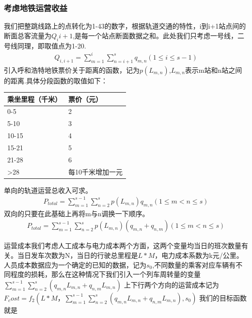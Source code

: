 \documentclass[12pt,a4paper]{mcmthesis}
\begin{document}
    \subsubsection{考虑地铁运营收益}
    我们把整跳线路上的点转化为1-43的数字，根据轨道交通的特性，i到i+1站点间的断面总客流量为$Q_{i}{i+1}$,是每一个站点断面数据之和。此处我们只考虑一号线，二号线同理，即取值点为1-20.
    \begin{equation}
        \begin{aligned}
            Q_{i,i+1}=\sum_{m=1}^{i}\sum_{n=i+1}^{s}q_{m,n}(1\leqslant i\leqslant s-1)
        \end{aligned}
    \end{equation}
    引入呼和浩特地铁票价关于距离的函数，记为$p(L_{m,n})$,$L_{m,n}$表示m站和n站之间的距离.具体分段函数的取值如下：
    \begin{table}
        \centering
        \begin{tabular}{|l|l|}
            \hline
            乘坐里程（千米） & 票价（元）     \\ \hline
            0-5      & 2         \\ \hline
            5-10     & 3         \\ \hline
            10-15    & 4         \\ \hline
            15-21    & 5         \\ \hline
            21-28    & 6         \\ \hline
            >28      & 每10千米增加一元 \\ \hline
        \end{tabular}
    \end{table}
    单向的轨道运营总收入可求。
    \begin{equation}
        \begin{aligned}
            P_{total}=\sum_{m=1}^{s-1}\sum_{n=2}^{s}p(L_{m,n})q_{m,n} (1\leqslant m< n\leq s)
        \end{aligned}
    \end{equation}
    双向的只要在此基础上再将m与n调换一下顺序。
    \begin{equation}
        \begin{aligned}
            P_{total}=\sum_{m=1}^{s-1}\sum_{n=2}^{s}p(L_{m,n})(q_{m,n}+q_{n,m}) (1\leqslant m< n\leq s)
        \end{aligned}
    \end{equation}

    运营成本我们考虑人工成本与电力成本两个方面，这两个变量均当日的班次数量有关。当日发车次数为N，当日的行驶总里程是$L*M$，电力成本系数为k元/公里。人员成本数据应为一个确定的已知的数据，记为$s_0$,不同数量的乘客对应车辆有不同程度的损耗，那么在这种情况下我们引入一个列车周转量的变量$\sum_{m=1}^{s-1}\sum_{n=2}^{s}(q_{m,n}L_{m,n}+q_{n,m}L_{m,n})$
    上下行两个方向的运营成本记为$F_cost=f_2(L*M，\sum_{m=1}^{s-1}\sum_{n=2}^{s}(q_{m,n}L_{m,n}+q_{n,m}L_{m,n}),s_0)$
    我们的目标函数就是
\end{document}
